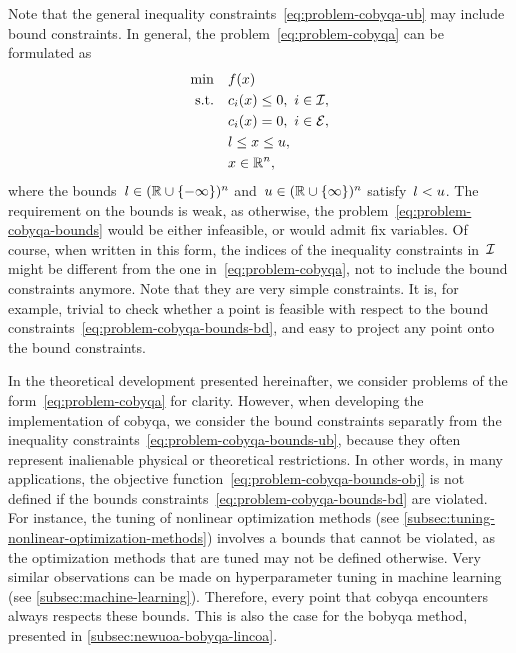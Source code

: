 Note that the general inequality constraints~\cref{eq:problem-cobyqa-ub} may include bound constraints.
In general, the problem~\cref{eq:problem-cobyqa} can be formulated as
\begin{subequations}
    \label{eq:problem-cobyqa-bounds}
    \begin{align}
        \min        & \quad f(x) \label{eq:problem-cobyqa-bounds-obj}\\
        \text{s.t.} & \quad c_{i}(x) \le 0, ~ i \in \mathcal{I}, \label{eq:problem-cobyqa-bounds-ub}\\
                    & \quad c_{i}(x) = 0, ~ i \in \mathcal{E},\\
                    & \quad l \le x \le u, \label{eq:problem-cobyqa-bounds-bd}\\
                    & \quad x \in \mathbb{R}^n, \nonumber
    \end{align}
\end{subequations}
where the bounds~$l \in (\mathbb{R} \cup \{-\infty\})^n$ and~$u \in (\mathbb{R} \cup \{\infty\})^n$ satisfy~$l < u$.
The requirement on the bounds is weak, as otherwise, the problem~\cref{eq:problem-cobyqa-bounds} would be either infeasible, or would admit fix variables.
Of course, when written in this form, the indices of the inequality constraints in~$\mathcal{I}$ might be different from the one in~\cref{eq:problem-cobyqa}, not to include the bound constraints anymore.
Note that they are very simple constraints.
It is, for example, trivial to check whether a point is feasible with respect to the bound constraints~\cref{eq:problem-cobyqa-bounds-bd}, and easy to project any point onto the bound constraints.

In the theoretical development presented hereinafter, we consider problems of the form~\cref{eq:problem-cobyqa} for clarity.
However, when developing the implementation of \gls{cobyqa}, we consider the bound constraints separatly from the inequality constraints~\cref{eq:problem-cobyqa-bounds-ub}, because they often represent inalienable physical or theoretical restrictions.
In other words, in many applications, the objective function~\cref{eq:problem-cobyqa-bounds-obj} is not defined if the bounds constraints~\cref{eq:problem-cobyqa-bounds-bd} are violated.
For instance, the tuning of nonlinear optimization methods (see \cref{subsec:tuning-nonlinear-optimization-methods}) involves a bounds that cannot be violated, as the optimization methods that are tuned may not be defined otherwise.
Very similar observations can be made on hyperparameter tuning in machine learning (see \cref{subsec:machine-learning}).
Therefore, every point that \gls{cobyqa} encounters always respects these bounds.
This is also the case for the \gls{bobyqa} method, presented in \cref{subsec:newuoa-bobyqa-lincoa}.

